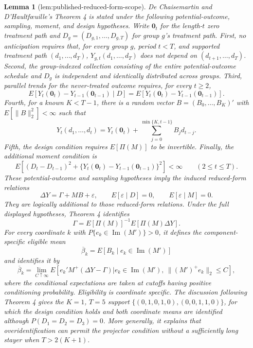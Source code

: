 \documentclass{article}
\newtheorem{lemma}{Lemma}
\begin{document}
\begin{lemma}[lem:published-reduced-form-scope]\label{lem:published-reduced-form-scope}
De Chaisemartin and D'Haultf\oe{}uille's Theorem 4 is stated under the following potential-outcome, sampling, moment, and design hypotheses. Write \(\mathbf 0_t\) for the length-\(t\) zero treatment path and \(D_g=(D_{g,1},\ldots,D_{g,T})\) for group \(g\)'s treatment path. First, no anticipation requires that, for every group \(g\), period \(t<T\), and supported treatment path \((d_1,\ldots,d_T)\), \(Y_{g,t}(d_1,\ldots,d_T)\) does not depend on \((d_{t+1},\ldots,d_T)\). Second, the group-indexed collection consisting of the entire potential-outcome schedule and \(D_g\) is independent and identically distributed across groups. Third, parallel trends for the never-treated outcome requires, for every \(t\ge2\),
\[
E\!\left[Y_t(\mathbf 0_t)-Y_{t-1}(\mathbf 0_{t-1})\mid D\right]
=E\!\left[Y_t(\mathbf 0_t)-Y_{t-1}(\mathbf 0_{t-1})\right].
\]
Fourth, for a known \(K<T-1\), there is a random vector \(B=(B_0,\ldots,B_K)'\) with \(E[\lVert B\rVert_2^2]<\infty\) such that
\[
Y_t(d_1,\ldots,d_t)
=Y_t(\mathbf 0_t)+\sum_{j=0}^{\min\{K,t-1\}}B_jd_{t-j}.
\]
Fifth, the design condition requires \(E[\Pi(M)]\) to be invertible. Finally, the additional moment condition is
\[
E\!\left[(D_t-D_{t-1})^2+\{Y_t(\mathbf 0_t)-Y_{t-1}(\mathbf 0_{t-1})\}^2\right]<\infty
\qquad(2\le t\le T).
\]
These potential-outcome and sampling hypotheses imply the induced reduced-form relations
\[
\Delta Y=\Gamma+MB+\varepsilon,
\qquad E[\varepsilon\mid D]=0,
\qquad E[\varepsilon\mid M]=0.
\]
They are logically additional to those reduced-form relations. Under the full displayed hypotheses, Theorem 4 identifies
\[
\Gamma=E[\Pi(M)]^{-1}E[\Pi(M)\Delta Y].
\]
For every coordinate \(k\) with \(P\{e_k\in\operatorname{Im}(M')\}>0\), it defines the component-specific eligible mean
\[
\overline\beta_k=E[B_k\mid e_k\in\operatorname{Im}(M')]
\]
and identifies it by
\[
\overline\beta_k
=\lim_{C\uparrow\infty}
E\!\left[e_k'M^+(\Delta Y-\Gamma)
\mathrel{\big|}e_k\in\operatorname{Im}(M'),\ \lVert(M')^+e_k\rVert_2\le C\right],
\]
where the conditional expectations are taken at cutoffs having positive conditioning probability. Eligibility is coordinate specific. The discussion following Theorem 4 gives the \(K=1\), \(T=5\) support \(\{(0,1,0,1,0),(0,0,1,1,0)\}\), for which the design condition holds and both coordinate means are identified although \(P(D_1=D_2=D_3)=0\). More generally, it explains that overidentification can permit the projector condition without a sufficiently long stayer when \(T>2(K+1)\).
\end{lemma}
\end{document}
